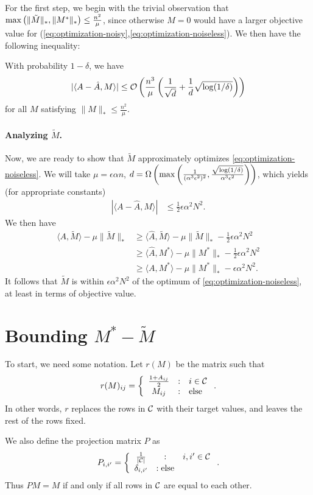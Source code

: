 \documentclass[11pt]{article}
\newcommand{\M}{\tilde{M}}
\newcommand{\A}{\hat{A}}
\newcommand{\oo}{\mathcal{O}}
\begin{document}
For the first step, we begin with the trivial observation that 
$\max\p{\|\M\|_*, \|M^*\|_*} \leq \frac{n^2}{\mu}$, since otherwise $M = 0$ 
would have a larger objective value for (\ref{eq:optimization-noisy},\ref{eq:optimization-noiseless}). 
We then have the following inequality:
\begin{lemma}
\label{lem:concentration}
With probability $1-\delta$, we have
\[ |\langle A-\A, M \rangle| \leq \oo\p{\frac{n^3}{\mu}\p{\frac{1}{\sqrt{d}} + \frac{1}{d}\sqrt{\log(1/\delta)}}} \]
for all $M$ satisfying $\|M\|_* \leq \frac{n^2}{\mu}$.
\end{lemma}
\paragraph{Analyzing $\M$.} Now, we are ready to show that 
$\M$ approximately optimizes \eqref{eq:optimization-noiseless}. 
We will take $\mu = \epsilon \alpha n$, 
$d = \Omega\left(\max\left(\frac{1}{(\alpha^3\epsilon^2)^2}, \frac{\sqrt{\log(1/\delta)}}{\alpha^3\epsilon^2}\right)\right)$, which yields (for appropriate constants)
\begin{align}
|\langle A-\A, M \rangle| &\leq \frac{1}{2}\epsilon \alpha^2 N^2.
\end{align}
We then have
\begin{align}
\langle A, \M \rangle - \mu \|\M\|_* &\geq \langle \A, \M \rangle - \mu \|\M\|_* - \frac{1}{2}\epsilon \alpha^2 N^2 \\
 &\geq \langle \A, M^* \rangle - \mu \|M^*\|_* - \frac{1}{2} \epsilon \alpha^2 N^2 \\
 &\geq \langle A, M^* \rangle - \mu \|M^*\|_* - \epsilon \alpha^2 N^2.
\end{align}
It follows that $\M$ is within $\epsilon \alpha^2N^2$ of the optimum of \eqref{eq:optimization-noiseless}, 
at least in terms of objective value.


\section{Bounding $M^* - \M$}
To start, we need some notation. Let $r(M)$ be the matrix such that
\[ r(M)_{ij} = \left\{ \begin{array}{ccl} \frac{1+A_{ij}}{2} & : & i \in \mathcal{C} \\ M_{ij} & : & \text{else} \end{array} \right.. \]
In other words, $r$ replaces the rows in $\mathcal{C}$ with their target values, and 
leaves the rest of the rows fixed.

We also define the projection matrix $P$ as
\[ P_{i,i'} = \left\{ \begin{array}{ccl} \frac{1}{|\mathcal{C}|} & : & i, i' \in \mathcal{C} \\ \delta_{i,i'} & : \text{else} \end{array} \right.. \]
Thus $PM = M$ if and only if all rows in $\mathcal{C}$ are equal to each other.
\end{document}
